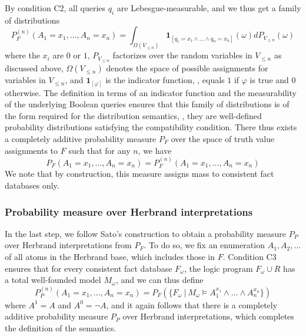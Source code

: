 By condition C2, all queries $q_i$ are  Lebesgue-measurable, and we thus get a family of distributions 
$$P_F^{(n)}(A_1=x_1,\ldots,A_n=x_n) = \int_{\Omega(V_{\leq n})} \mathbf{1}_{[q_1=x_1\wedge\ldots\wedge q_n=x_n]}(\omega)dP_{V_{\leq n}}(\omega) $$ where the $x_i$ are $0$ or $1$, $P_{V_{\leq n}}$ factorizes over the random variables in $V_{\leq n}$ as discussed above, $\Omega(V_{\leq n})$ denotes the space of possible assignments for variables in $V_{\leq n}$, and $\mathbf{1}_{[\varphi]}$ is the indicator function, \ie, equals $1$ if $\varphi$ is true and $0$ otherwise. The definition in terms of an indicator function and the measurability of the underlying Boolean queries ensures that this family of distributions is of the form required for the distribution semantics, \ie, they are well-defined probability distributions satisfying the compatibility condition. There thus exists a completely additive probability measure $P_F$ over the space of truth value assignments to $F$ such that for any $n$, we have
$$P_F(A_1=x_1,\ldots,A_n=x_n) =P_F^{(n)}(A_1=x_1,\ldots,A_n=x_n)$$
We note that by construction, this measure assigns mass to consistent fact databases only. 

\subsubsection{Probability measure over Herbrand interpretations}
In the last step, we follow Sato's construction to obtain a probability measure $P_P$ over Herbrand interpretations from $P_F$. To do so, we fix an enumeration $A_1,A_2,\ldots$ of all atoms in the Herbrand base, which includes those in $F$. 
Condition C3 ensures that for every consistent fact database $F_{\omega}$, the logic program $F_{\omega}\cup R$ has a total well-founded model $M_{\omega}$, and we can thus define   
$$P_P^{(n)}(A_1=x_1,\ldots,A_n=x_n) = P_F(\{F_{\omega}~|~ M_{\omega}\models A_1^{x_1}\wedge\ldots\wedge A_n^{x_n}\})$$ where $A^1=A$ and $A^0=\neg A$, and it again follows that there is a completely additive probability measure $P_P$ over Herbrand interpretations, which completes the definition of the semantics. 
